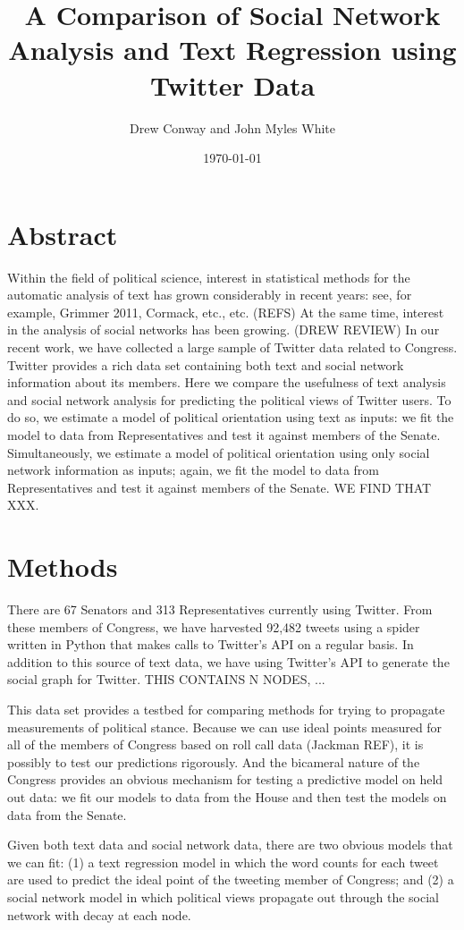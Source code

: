 \documentclass[11pt]{article}
\title{A Comparison of Social Network Analysis and Text Regression using Twitter Data}
\author{Drew Conway and John Myles White}
\date{\today}
\begin{document}
\maketitle

\section{Abstract}
Within the field of political science, interest in statistical methods for the automatic analysis of text has grown considerably in recent years: see, for example, Grimmer 2011, Cormack, etc., etc. (REFS) At the same time, interest in the analysis of social networks has been growing. (DREW REVIEW) In our recent work, we have collected a large sample of Twitter data related to Congress. Twitter provides a rich data set containing both text and social network information about its members. Here we compare the usefulness of text analysis and social network analysis for predicting the political views of Twitter users. To do so, we estimate a model of political orientation using text as inputs: we fit the model to data from Representatives and test it against members of the Senate. Simultaneously, we estimate a model of political orientation using only social network information as inputs; again, we fit the model to data from Representatives and test it against members of the Senate. WE FIND THAT XXX.

\section{Methods}
There are 67 Senators and 313 Representatives currently using Twitter. From these members of Congress, we have harvested 92,482 tweets using a spider written in Python that makes calls to Twitter's API on a regular basis. In addition to this source of text data, we have using Twitter's API to generate the social graph for Twitter. THIS CONTAINS N NODES, ...

This data set provides a testbed for comparing methods for trying to propagate measurements of political stance. Because we can use ideal points measured for all of the members of Congress based on roll call data (Jackman REF), it is possibly to test our predictions rigorously. And the bicameral nature of the Congress provides an obvious mechanism for testing a predictive model on held out data: we fit our models to data from the House and then test the models on data from the Senate.

Given both text data and social network data, there are two obvious models that we can fit: (1) a text regression model in which the word counts for each tweet are used to predict the ideal point of the tweeting member of Congress; and (2) a social network model in which political views propagate out through the social network with decay at each node.
\end{document}
